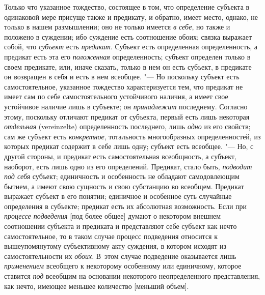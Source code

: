 Только что указанное тождество, состоящее в том, что
определение субъекта в одинаковой мере присуще также и предикату, и
обратно, имеет место, однако, не только в нашем размышлении; оно не только
имеется {\em в себе}, но
также и положено в суждении; ибо суждение есть соотношение обоих; связка
выражает собой, что {\em субъект}
есть {\em предикат}.
Субъект есть определенная определенность, а предикат есть эта
его {\em положенная}
определенность; субъект определен только в своем предикате,
или, иначе сказать, только в нем он есть субъект, в предикате он возвращен
в себя и есть в нем всеобщее. "--- Но поскольку субъект есть
самостоятельное, указанное тождество характеризуется тем, что предикат не
имеет сам по себе самостоятельного устойчивого наличия, а имеет свое
устойчивое наличие лишь в субъекте; он
{\em принадлежит}
последнему. Согласно этому, поскольку отличают предикат от
субъекта, первый есть лишь некоторая
{\em отдельная} (vereinzelte)
определенность последнего, лишь
{\em одно} из его
свойств; сам же субъект есть
{\em конкретное},
тотальность многообразных определенностей, из которых
предикат содержит в себе лишь одну; субъект есть всеобщее. "---
Но, с другой стороны, и предикат есть самостоятельная
всеобщность, а субъект, наоборот, есть лишь одно из его определений.
Предикат, стало быть, {\em подводит под
себя} субъект; единичность и особенность не обладают
самодовлеющим бытием, а имеют свою сущность и свою субстанцию во всеобщем.
Предикат выражает субъект в его понятии; единичное и особенное суть
случайные определения в субъекте; предикат есть их абсолютная возможность.
Если при {\em процессе подведения}
[под более общее] думают о некотором внешнем соотношении
субъекта и предиката и представляют себе субъект как нечто самостоятельное,
то в таком случае процесс подведения относится к вышеупомянутому
субъективному акту суждения, в котором исходят из самостоятельности их
{\em обоих}. В~этом
случае подведение оказывается лишь
{\em применением}
всеобщего к некоторому особенному или единичному, которое
ставится {\em под}
всеобщим на основании некоторого
неопределенного представления, как нечто, имеющее меньшее
количество [меньший объем].

